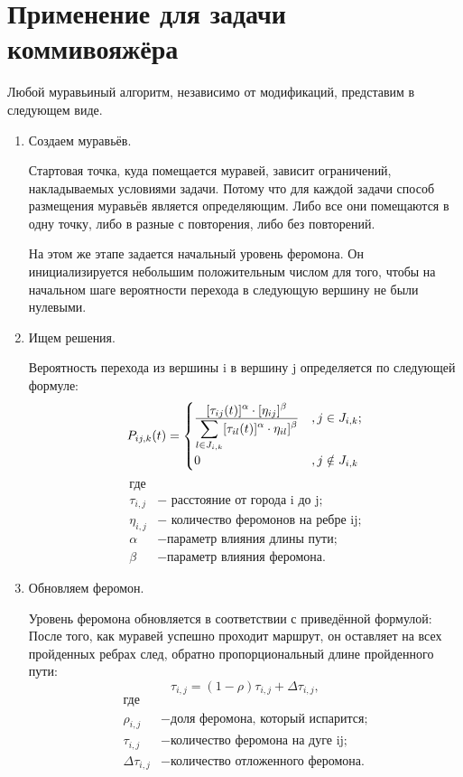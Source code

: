 \documentclass[a4paper,oneside,14pt]{extreport}
\begin{document}
\section{Применение для задачи коммивояжёра}
Любой муравьиный алгоритм, независимо от модификаций, представим в следующем виде.
\begin{enumerate}
	\item  Создаем муравьёв.
	
	Стартовая точка, куда помещается муравей, зависит ограничений,   накладываемых условиями задачи. Потому что для каждой задачи   способ размещения муравьёв является определяющим. Либо все    они помещаются в одну точку, либо в разные с повторения, либо    без повторений. 
	
	На этом же этапе задается начальный уровень феромона. Он    инициализируется небольшим положительным числом для того,    чтобы на начальном шаге вероятности перехода в следующую вершину не были нулевыми. 
	
	\item Ищем решения.
	
	Вероятность перехода из вершины i в вершину j определяется по следующей формуле:\\   
	\begin{equation}
	P_{i j, k} (t)= \begin{cases}
	\displaystyle[\tau_{ij}(t)]^\alpha \cdot [\eta_{ij}]^\beta\over 
	\displaystyle\sum\limits_{l \in J_{i, k }} [\tau_{il}(t)]^\alpha \cdot \eta_{il}]^\beta  &,  j \in J_{i, k};\\
	0 &,  j \notin J_{i, k}
	\end{cases}
	\end{equation}
	\begin{align*}
	\text{где} \\
	\tau _{i,j} &- \text{ расстояние от города i до j;} \\
	\eta _{i,j} &- \text{ количество феромонов на ребре ij;} \\
	\alpha &- \text{параметр влияния длины пути;} \\
	\beta &- \text{параметр влияния феромона.}
	\end{align*}
	
	\item Обновляем феромон.
	
	Уровень феромона обновляется в соответствии с приведённой формулой:
	После того, как муравей успешно проходит маршрут, он оставляет на всех пройденных ребрах след, обратно пропорциональный длине пройденного пути:
	\begin{equation}\label{form:eva} 
	\tau _{i,j}=(1-\rho )\tau _{i,j}+\Delta \tau _{i,j},
	\end{equation}
	\begin{align*}
	\text{где} \\
	\rho _{i,j} &- \text{доля феромона, который испарится;} \\
	\tau _{i,j} &- \text{количество феромона на дуге ij;} \\
	\Delta \tau _{i,j} &- \text{количество отложенного феромона.}
	\end{align*}
	

\end{enumerate}
\end{document}

